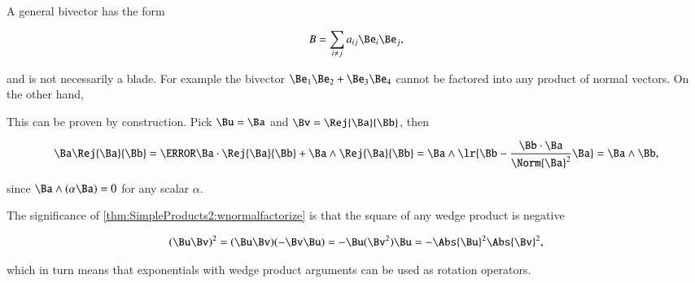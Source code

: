 %
%
A general bivector has the form

\begin{dmath}\label{eqn:SimpleProducts2:1800}
B = \sum_{i \ne j} a_{ij} \Be_i \Be_j,
\end{dmath}

and is not necessarily a blade.  For example the bivector \( \Be_1 \Be_2 + \Be_3 \Be_4 \) cannot be factored into any product of normal vectors.
On the other hand,


This can be proven by construction.  Pick \( \Bu = \Ba \) and \( \Bv = \Rej{\Ba}{\Bb} \), then

\begin{dmath}\label{eqn:SimpleProducts2:1840}
\Ba \Rej{\Ba}{\Bb}
=
\cancel{\Ba \cdot \Rej{\Ba}{\Bb}}
+
\Ba \wedge \Rej{\Ba}{\Bb}
=
\Ba \wedge \lr{ \Bb - \frac{\Bb \cdot \Ba}{\Norm{\Ba}^2} \Ba }
=
\Ba \wedge \Bb,
\end{dmath}

since \( \Ba \wedge (\alpha \Ba) = 0 \) for any scalar \( \alpha \).

The significance of \cref{thm:SimpleProducts2:wnormalfactorize} is that the square of any wedge product is negative

\begin{dmath}\label{eqn:SimpleProducts2:1820}
(\Bu \Bv)^2
=
(\Bu \Bv) (-\Bv \Bu)
=
-\Bu (\Bv^2) \Bu
=
- \Abs{\Bu}^2 \Abs{\Bv}^2,
\end{dmath}

which in turn means that exponentials with wedge product arguments can be used as rotation operators.


